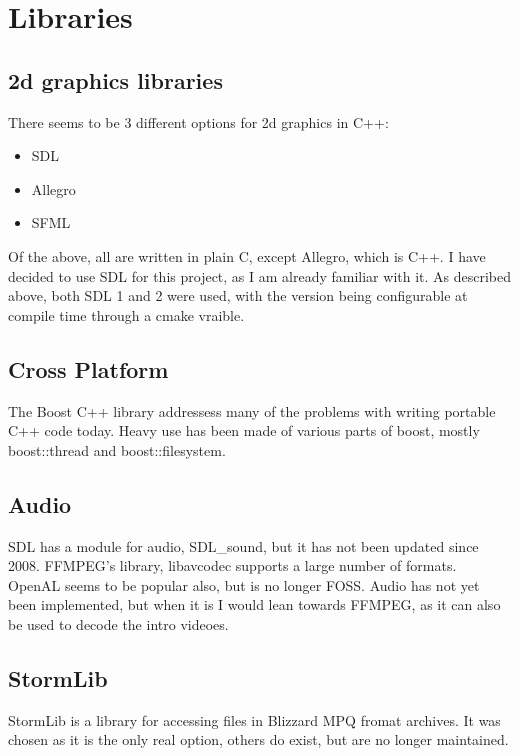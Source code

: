    	\section{Libraries}
       	\subsection{2d graphics libraries}
    	There seems to be 3 different options for 2d graphics in C++:
    	\begin{itemize}
    	    \item{SDL}
    	    \item{Allegro}
    	    \item{SFML}
    	\end{itemize}
    	
    	Of the above, all are written in plain C, except Allegro, which is C++.
    	I have decided to use SDL for this project, as I am already familiar with it.
    	As described above, both SDL 1 and 2 were used, with the version being configurable at compile time through a cmake vraible.
    	
    	\subsection{Cross Platform}
        The Boost C++ library addressess many of the problems with writing portable C++ code today.
     	Heavy use has been made of various parts of boost, mostly boost::thread and boost::filesystem.
        
        \subsection{Audio}
        SDL has a module for audio, SDL\_sound\cite{sdls}, but it has not been updated since 2008.
        FFMPEG's library, libavcodec\cite{libavcodec} supports a large number of formats.
        OpenAL seems to be popular also, but is no longer FOSS.
        Audio has not yet been implemented, but when it is I would lean towards FFMPEG, as it can also be used to decode the intro videoes.
        
        \subsection{StormLib}
        StormLib\cite{stormlib} is a library for accessing files in Blizzard MPQ fromat archives.
        It was chosen as it is the only real option, others do exist, but are no longer maintained.
